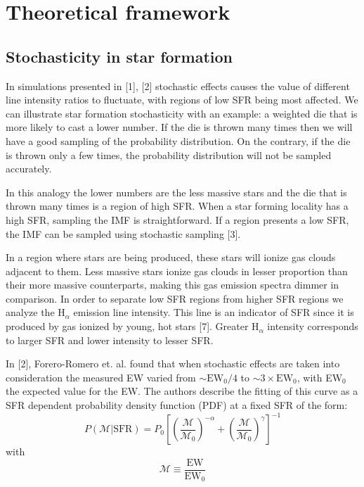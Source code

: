 \chapter{Theoretical framework}

\section{Stochasticity in star formation}

In simulations presented in [1], [2] stochastic effects causes the value of different line intensity ratios to fluctuate, with
regions of low SFR being most affected. We can illustrate star formation stochasticity with an example: a weighted die that is more
likely to cast a lower number. If the die is thrown many times then we will have a good sampling of the probability distribution.
On the contrary, if the die is thrown only a few times, the probability distribution will not be sampled accurately.

In this analogy the lower numbers are the less massive stars and the die that is thrown many times is a region of high SFR. When a
star forming locality has a high SFR, sampling the IMF is straightforward. If a region presents a low SFR, the IMF can be sampled
using stochastic sampling [3].

In a region where stars are being produced, these stars will ionize gas clouds adjacent to them. Less massive stars ionize gas
clouds in lesser proportion than their more massive counterparts, making this gas emission spectra dimmer in comparison.
In order to separate low SFR regions from higher SFR regions we analyze the H$_{\alpha}$ emission line intensity. This line is an
indicator of SFR since it is produced by gas ionized by young, hot stars [7]. Greater H$_{\alpha}$ intensity corresponds to larger
SFR and lower intensity to lesser SFR.

In [2], Forero-Romero et. al. found that when stochastic effects are taken into consideration the measured EW varied from
$\sim \mathrm{EW}_0/4$ to $\sim 3\times \mathrm{EW}_0$, with EW$_0$ the expected value for the EW. The authors describe the
fitting of this curve as a SFR dependent probability density function (PDF) at a fixed SFR of the form:
\begin{equation}
  P\left( \mathcal{M} | \mathrm{SFR} \right) = P_0 \left[ \left( \frac{\mathcal{M}}{\mathcal{M}_0} \right)^{-\alpha} + \left( \frac{\mathcal{M}}{\mathcal{M}_0} \right)^{\gamma} \right]^{-1}
  \label{eq2-1}
\end{equation}
with
\begin{equation}
  \mathcal{M} \equiv \frac{\mathrm{EW}}{\mathrm{EW_0}}
  \label{eq2-2}
\end{equation}

